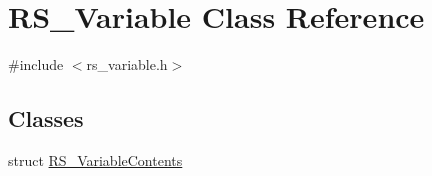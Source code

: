 \hypertarget{classRS__Variable}{\section{R\-S\-\_\-\-Variable Class Reference}
\label{classRS__Variable}
}


{\ttfamily \#include $<$rs\-\_\-variable.\-h$>$}

\subsection*{Classes}
\begin{DoxyCompactItemize}
\item 
struct \hyperlink{structRS__Variable_1_1RS__VariableContents}{R\-S\-\_\-\-Variable\-Contents}
\end{DoxyCompactItemize}
